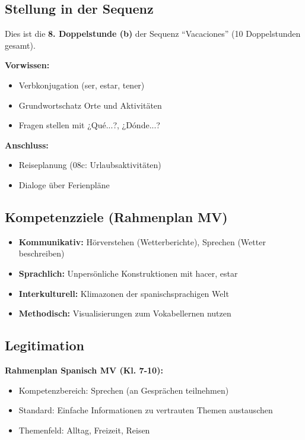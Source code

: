 \documentclass[11pt,a4paper]{article}
\newcommand{\reihenthema}{Vacaciones}
\newcommand{\reihenstunden}{10}
\begin{document}
\subsection{Stellung in der Sequenz}
Dies ist die \textbf{8. Doppelstunde (b)} der Sequenz ``\reihenthema'' (\reihenstunden{} Doppelstunden gesamt).

\textbf{Vorwissen:}
\begin{itemize}
    \item Verbkonjugation (ser, estar, tener)
    \item Grundwortschatz Orte und Aktivitäten
    \item Fragen stellen mit ¿Qué...?, ¿Dónde...?
\end{itemize}

\textbf{Anschluss:}
\begin{itemize}
    \item Reiseplanung (08c: Urlaubsaktivitäten)
    \item Dialoge über Ferienpläne
\end{itemize}

\subsection{Kompetenzziele (Rahmenplan MV)}
\begin{itemize}
    \item \textbf{Kommunikativ:} Hörverstehen (Wetterberichte), Sprechen (Wetter beschreiben)
    \item \textbf{Sprachlich:} Unpersönliche Konstruktionen mit hacer, estar
    \item \textbf{Interkulturell:} Klimazonen der spanischsprachigen Welt
    \item \textbf{Methodisch:} Visualisierungen zum Vokabellernen nutzen
\end{itemize}

\subsection{Legitimation}
\textbf{Rahmenplan Spanisch MV (Kl. 7-10):}
\begin{itemize}
    \item Kompetenzbereich: Sprechen (an Gesprächen teilnehmen)
    \item Standard: Einfache Informationen zu vertrauten Themen austauschen
    \item Themenfeld: Alltag, Freizeit, Reisen
\end{itemize}
\end{document}
